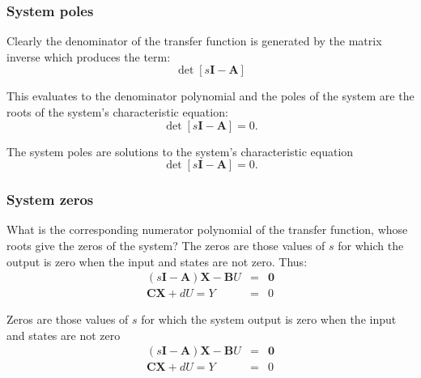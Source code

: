 \subsubsection*{System poles}

Clearly the denominator of the transfer function is generated by the matrix inverse which produces the term:
$$\det[s\mathbf{I}-\mathbf{A}]$$
 
This evaluates to the denominator polynomial and the poles of the system are the roots of the system's characteristic equation:
$$\det[s\mathbf{I}-\mathbf{A}] = 0.$$
\ifslidesonly
\begin{slide}
	The system poles are solutions to the system's characteristic equation
	$$\det[s\mathbf{I}-\mathbf{A}] = 0.$$
\end{slide}
\fi


\subsubsection*{System zeros}

What is the corresponding numerator polynomial of the transfer function, whose roots give the zeros of the system?
The zeros are those values of $s$ for which the output is zero when the input and states are not zero. Thus:
\begin{eqnarray*}
(s\mathbf{I}-\mathbf{A})\mathbf{X}-\mathbf{B}U & = & \mathbf{0} \\
\mathbf{CX}+dU = Y & = & 0
\end{eqnarray*}

\ifslidesonly
\begin{slide}
	Zeros are those values of $s$ for which the system output is zero when the input and states are not zero
	\begin{eqnarray*}
		(s\mathbf{I}-\mathbf{A})\mathbf{X}-\mathbf{B}U & = & \mathbf{0} \\
		\mathbf{CX}+dU = Y & = & 0
	\end{eqnarray*}
	
\end{slide}
\fi
 

\ifslidesonly
\begin{slide}
	
\end{slide}
\fi




\ifslidesonly
\begin{slide}
	
\end{slide}
\fi

